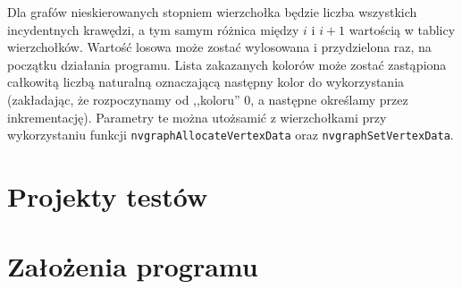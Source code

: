 \documentclass{article}
\begin{document}
	Dla grafów nieskierowanych stopniem wierzchołka będzie liczba wszystkich incydentnych krawędzi, a tym samym różnica między $i$ i $i+1$ wartością w tablicy wierzchołków. Wartość losowa może zostać wylosowana i przydzielona raz, na początku działania programu. Lista zakazanych kolorów może zostać zastąpiona całkowitą liczbą naturalną oznaczającą następny kolor do wykorzystania (zakładając, że rozpoczynamy od ,,koloru'' 0, a następne określamy przez inkrementację). Parametry te można utożsamić z wierzchołkami przy wykorzystaniu funkcji \texttt{nvgraphAllocateVertexData} oraz \texttt{nvgraphSetVertexData}.
	
	\section{Projekty testów}
	\section{Założenia programu}
	
	

 


\end{document}
